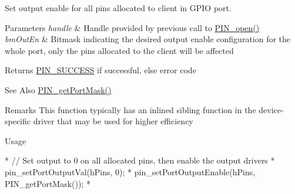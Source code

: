 Set output enable for all pins allocated to client in G\-P\-I\-O port. 


\begin{DoxyParams}{Parameters}
{\em handle} & Handle provided by previous call to \hyperlink{_p_i_n_8h_a731c5bb641ffeb064579432adfc8dba0}{P\-I\-N\-\_\-open()} \\
\hline
{\em bm\-Out\-En} & Bitmask indicating the desired output enable configuration for the whole port, only the pins allocated to the client will be affected \\
\hline
\end{DoxyParams}
\begin{DoxyReturn}{Returns}
\hyperlink{_p_i_n_8h_abe0ad59bbf09e51fe37195a5e70b23f6a5c9610fffc152c333036f2c2c7ee54e8}{P\-I\-N\-\_\-\-S\-U\-C\-C\-E\-S\-S} if successful, else error code 
\end{DoxyReturn}
\begin{DoxySeeAlso}{See Also}
\hyperlink{_p_i_n_8h_a9f5b2367253b355909032742a7e6b5e0}{P\-I\-N\-\_\-get\-Port\-Mask()} 
\end{DoxySeeAlso}
\begin{DoxyRemark}{Remarks}
This function typically has an inlined sibling function in the device-\/specific driver that may be used for higher efficiency 
\end{DoxyRemark}
\begin{DoxyParagraph}{Usage}

\begin{DoxyCode}
*       \textcolor{comment}{// Set output to 0 on all allocated pins, then enable the output drivers}
*       pin\_setPortOutputVal(hPins, 0);
*       pin\_setPortOutputEnable(hPins, PIN_getPortMask());
*       
\end{DoxyCode}
 
\end{DoxyParagraph}
